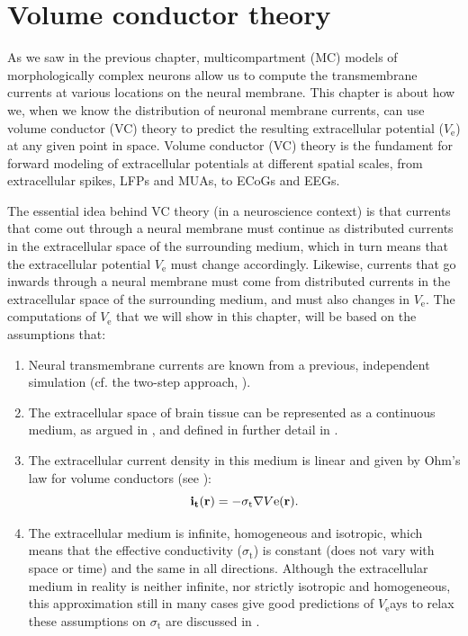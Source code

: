 \chapter{Volume conductor theory}
\label{chap:VC} %
As we saw in the previous chapter, multicompartment (MC) models of morphologically complex neurons allow us to compute the transmembrane currents at various locations on the neural membrane. This chapter is about how we, when we know the distribution of neuronal membrane currents, can use volume conductor (VC) theory to predict the resulting extracellular potential ($V_\mathrm{e}$) at any given point in space. Volume conductor (VC) theory is the fundament for forward modeling of extracellular potentials at different spatial scales, from extracellular spikes, LFPs and MUAs, to ECoGs and EEGs. 

The essential idea behind VC theory (in a neuroscience context) is that currents that come out through a neural membrane must continue as distributed currents in the extracellular space of the surrounding medium, which in turn means that the extracellular potential $V_\mathrm{e}$ must change accordingly. Likewise, currents that go inwards through a neural membrane must come from distributed currents in the extracellular space of the surrounding medium, and must also  changes in $V_\mathrm{e}$. The computations of $V_\mathrm{e}$ that we will show in this chapter, will be based on the assumptions that:
\begin{enumerate}
\item Neural transmembrane currents are known from a previous, independent simulation (cf. the two-step approach,  ).
\item The extracellular space of brain tissue can be represented as a continuous medium, as argued in , and defined in further detail in . 
\item The extracellular current density in this medium is linear and given by Ohm's law for volume conductors (see ):
\begin{equation}
{\bf i_t}({\bf r}) = - \sigma_\mathrm{t} \nabla V\mathrm{e}({\bf r}).
\label{eq:VC:ohmici}
\end{equation}
\item The extracellular medium is infinite, homogeneous and isotropic, which means that the effective conductivity ($\sigma_\mathrm{t}$) is constant (does not vary with space or time) and the same in all directions. Although the extracellular medium in reality is neither infinite, nor strictly isotropic and homogeneous, this approximation  still in many cases give  good predictions of $V_\mathrm{e}$ays to relax these assumptions on $\sigma_\mathrm{t}$ are discussed in .
\end{enumerate}

